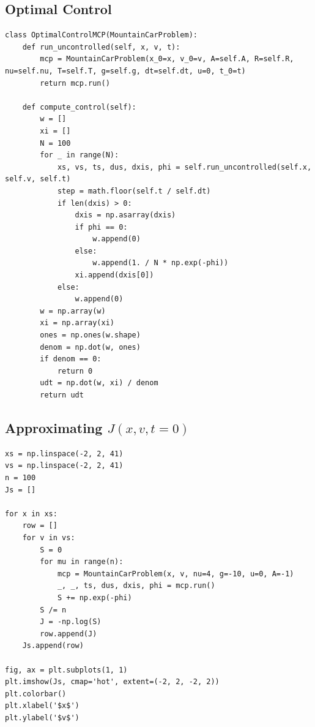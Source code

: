 \documentclass[10pt,a4paper]{article}
\begin{document}
\subsection{Optimal Control}
\begin{lstlisting}
class OptimalControlMCP(MountainCarProblem):
    def run_uncontrolled(self, x, v, t):
        mcp = MountainCarProblem(x_0=x, v_0=v, A=self.A, R=self.R, nu=self.nu, T=self.T, g=self.g, dt=self.dt, u=0, t_0=t)
        return mcp.run()
    
    def compute_control(self):
        w = []
        xi = []
        N = 100
        for _ in range(N):
            xs, vs, ts, dus, dxis, phi = self.run_uncontrolled(self.x, self.v, self.t)
            step = math.floor(self.t / self.dt)
            if len(dxis) > 0:
                dxis = np.asarray(dxis)
                if phi == 0:
                    w.append(0)
                else:
                    w.append(1. / N * np.exp(-phi))
                xi.append(dxis[0])
            else:
                w.append(0)
        w = np.array(w)
        xi = np.array(xi)
        ones = np.ones(w.shape)
        denom = np.dot(w, ones)
        if denom == 0:
            return 0
        udt = np.dot(w, xi) / denom
        return udt
\end{lstlisting}

\subsection{Approximating $J(x, v, t=0)$}
\begin{lstlisting}
xs = np.linspace(-2, 2, 41)
vs = np.linspace(-2, 2, 41)
n = 100
Js = []

for x in xs:
    row = []
    for v in vs:
        S = 0
        for mu in range(n):
            mcp = MountainCarProblem(x, v, nu=4, g=-10, u=0, A=-1)
            _, _, ts, dus, dxis, phi = mcp.run()
            S += np.exp(-phi)
        S /= n
        J = -np.log(S)
        row.append(J)
    Js.append(row)

fig, ax = plt.subplots(1, 1)
plt.imshow(Js, cmap='hot', extent=(-2, 2, -2, 2))
plt.colorbar()
plt.xlabel('$x$')
plt.ylabel('$v$')
\end{lstlisting}
\end{document}
